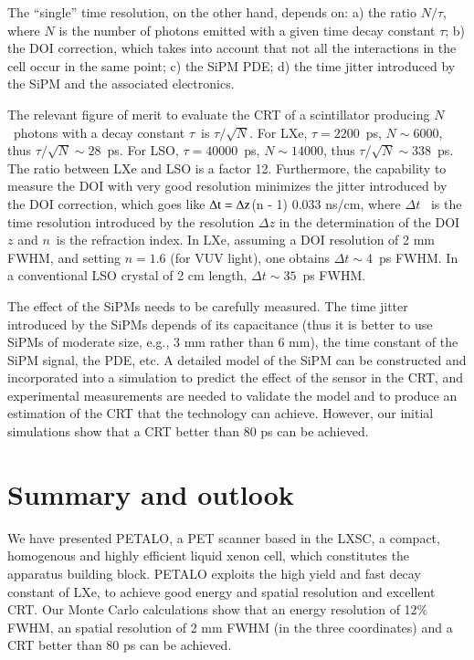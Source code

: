 \documentclass[review]{elsarticle}
\begin{document}
The ``single'' time resolution, on the other hand, depends on: a) the ratio $N/\tau$, where $N$ is the number of photons emitted with a given time decay constant $\tau$; b) the DOI correction, which takes into account that not all the interactions in the cell occur in the same point; c) the SiPM PDE; d) the time jitter introduced by the SiPM and the associated electronics. 

The relevant figure of merit to evaluate the CRT of a scintillator producing $N$~photons with a decay constant $\tau$~is $\tau/\sqrt{N}$. For LXe, $\tau=2200$~ps, $N \sim 6000$, thus 
$\tau/\sqrt{N} \sim 28$~ps. For LSO, $\tau=40000$~ps, $N \sim 14000$, thus 
$\tau/\sqrt{N} \sim 338$~ps. The ratio between LXe and LSO is a factor 12. 
Furthermore, the capability to measure the DOI with very good resolution minimizes the jitter introduced by the DOI correction, which goes like
${\rm \Delta t = \Delta z}$(n - 1) 0.033 ns/cm, where $\Delta t$~ is the time resolution introduced by the resolution $\Delta z$ in the determination of the DOI $z$ and $n$~is the refraction index. In LXe, assuming a DOI resolution of 2 mm FWHM, and setting $n=1.6$ (for VUV light), one obtains $\Delta t \sim 4$~ps FWHM. In a conventional LSO crystal of 2 cm length, $\Delta t \sim 35$~ps FWHM.

The effect of the SiPMs needs to be carefully measured. The time jitter introduced by the SiPMs depends of its capacitance (thus it is better to use SiPMs of moderate size, e.g., 3 mm rather than 6 mm), the time constant of the SiPM signal, the PDE, etc. A detailed model of the SiPM can be constructed and incorporated into a simulation to predict the effect of the sensor in the CRT, and experimental measurements are needed to validate the model and to produce an estimation of the CRT that the technology can achieve. However, our initial simulations show that a CRT better than 80 ps can be achieved. 


\section{Summary and outlook}\label{sec.conclu}

We have presented PETALO, a PET scanner based in the LXSC, a compact, homogenous and highly efficient liquid xenon cell, which constitutes the apparatus building block. PETALO exploits the high yield and fast decay constant of LXe, to achieve good energy and spatial resolution and excellent CRT. Our Monte Carlo calculations show that an energy resolution of 12\% FWHM, an spatial resolution of 2 mm FWHM (in the three coordinates) and a CRT better than 80 ps can be achieved. 
\end{document}
